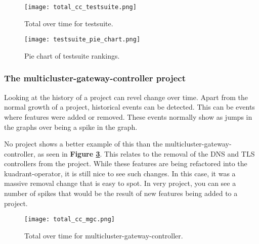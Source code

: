 \begin{figure}
	\texttt{[image: total\_cc\_testsuite.png]}
	\caption{Total \cc over time for testsuite.}
	\label{fig:total_cc_testsuite}
\end{figure}

\begin{figure}
	\texttt{[image: testsuite\_pie\_chart.png]}
	\caption{Pie chart of testsuite rankings.}
	\label{fig:testsuite_pie_chart}
\end{figure}

\subsubsection{The multicluster-gateway-controller project}
Looking at the history of a project can revel change over time.
Apart from the normal growth of a project, historical events can be detected.
This can be events where features were added or removed.
These events normally show as jumps in the graphs over being a spike in the graph.

No project shows a better example of this than the multicluster-gateway-controller, as seen in \textbf{Figure \ref{fig:total_cc_mgc}}.
This relates to the removal of the DNS and TLS controllers from the project.
While these features are being refactored into the kuadrant-operator, it is still nice to see such changes.
In this case, it was a massive removal change that is easy to spot.
In very project, you can see a number of spikes that would be the result of new features being added to a project.

\begin{figure}
	\texttt{[image: total\_cc\_mgc.png]}
	\caption{Total \cc over time for multicluster-gateway-controller.}
	\label{fig:total_cc_mgc}
\end{figure}









